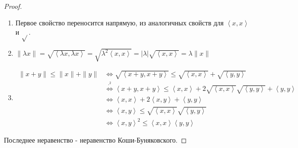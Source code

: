 \begin{properties}
\begin{enumerate}
\begin{proof}
                \begin{enumerate}
                    \item Первое свойство переносится напрямую, из аналогичных свойств для $\left<x, x\right>$ и $\sqrt{} $.
                    \item $\|\lambda x\| = \sqrt{\left<\lambda x, \lambda x\right>} = \sqrt{\lambda^2 \left<x, x\right>} = |\lambda| \sqrt{\left<x, x\right>} = \lambda \|x\|$ 
                    \item
                        \begin{equation*}
                            \begin{split}
                                \|x + y\| \le \|x\| + \|y\|
                                &\iff \sqrt{\left<x + y, x+y\right>} \le \sqrt{\left<x, x\right>} + \sqrt{\left<y, y\right>}\\
                                &\overset{\cdot^2}{\iff} \left<x + y, x + y\right>  \le \left<x, x\right> + 2 \sqrt{\left<x, x\right>} \sqrt{\left<y, y\right>} + \left<y, y\right>\\
                                &\iff \left<x, x\right> + 2\left<x, y\right> + \left<y, y\right>\\
                                &\iff \left<x, y\right> \le \sqrt{\left<x, x\right>}\sqrt{\left<y, y\right>}\\
                                &\iff \left<x, y\right>^2 \le \left<x, x\right>\left<y, y\right>
                            \end{split}
                        \end{equation*}
                \end{enumerate}
                Последнее неравенство - неравенство Коши-Буняковского.
            \end{proof}
    \end{enumerate}
\end{properties}
